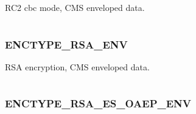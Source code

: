 \documentclass[letterpaper,10pt,english]{sphinxmanual}
\begin{document}
\begin{fulllineitems}
\label{appdev/refs/macros/ENCTYPE_RC2_CBC_ENV:ENCTYPE_RC2_CBC_ENV}
\end{fulllineitems}


RC2 cbc mode, CMS enveloped data.

\begin{tabulary}{\linewidth}{|L|L|}
\hline

 & 
\\
\hline\end{tabulary}



\subsubsection{ENCTYPE\_RSA\_ENV}
\label{appdev/refs/macros/ENCTYPE_RSA_ENV:enctype-rsa-env-data}\label{appdev/refs/macros/ENCTYPE_RSA_ENV:enctype-rsa-env}\label{appdev/refs/macros/ENCTYPE_RSA_ENV::doc}

\begin{fulllineitems}
\label{appdev/refs/macros/ENCTYPE_RSA_ENV:ENCTYPE_RSA_ENV}
\end{fulllineitems}


RSA encryption, CMS enveloped data.

\begin{tabulary}{\linewidth}{|L|L|}
\hline

 & 
\\
\hline\end{tabulary}



\subsubsection{ENCTYPE\_RSA\_ES\_OAEP\_ENV}
\label{appdev/refs/macros/ENCTYPE_RSA_ES_OAEP_ENV::doc}\label{appdev/refs/macros/ENCTYPE_RSA_ES_OAEP_ENV:enctype-rsa-es-oaep-env}\label{appdev/refs/macros/ENCTYPE_RSA_ES_OAEP_ENV:enctype-rsa-es-oaep-env-data}

\begin{fulllineitems}
\label{appdev/refs/macros/ENCTYPE_RSA_ES_OAEP_ENV:ENCTYPE_RSA_ES_OAEP_ENV}
\end{fulllineitems}
\end{document}
